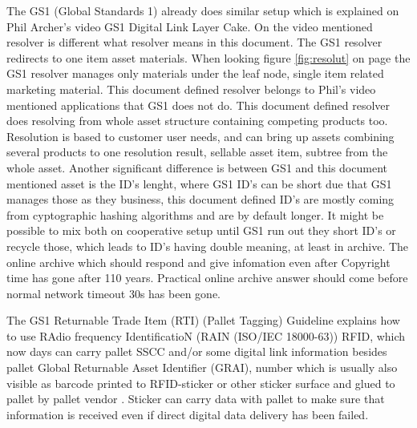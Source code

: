 The GS1 (Global Standards 1) already does similar setup which is explained on
Phil Archer's video GS1 Digital Link Layer Cake\cite{GS1DigitalLink}. On the
video mentioned resolver is different what resolver means in this document.
The GS1 resolver redirects to one item asset materials. When looking figure
\ref{fig:resolut} on page \pageref{fig:resolut} the GS1 resolver manages only
materials under the leaf node, single item related marketing material. This
document defined resolver belongs to Phil's video mentioned applications that
GS1 does not do. This document defined resolver does resolving from whole
asset structure containing competing products too. Resolution is based to
customer user needs, and  can bring up assets combining several products to one
resolution result, sellable asset item, subtree from the whole asset. Another
significant difference is between GS1 and this document mentioned asset is the
ID's lenght, where GS1 ID's can be short due that GS1 manages those as they
business, this document defined ID's are mostly coming from cyptographic
hashing algorithms\cite{CompHashFunc} and are by default longer.
It might be possible to mix both on cooperative setup until GS1 run out they
short ID's or recycle those, which leads to ID's having double meaning, at
least in archive. The online archive which should respond and give infomation
even after Copyright time \cite{CopyrightLengths} has gone after 110 years.
Practical online archive answer should come before normal network timeout 30s
has been gone. %

The GS1 Returnable Trade Item (RTI) (Pallet Tagging) Guideline\cite{RTIguideline}
explains how to use RAdio frequency IdentificatioN (RAIN (ISO/IEC 18000-63))
RFID\cite{UHFforRAIN}, which now days can carry pallet SSCC and/or some digital
link information besides pallet Global Returnable Asset Identifier (GRAI),
number which is usually also visible as barcode printed to RFID-sticker
or other sticker surface and glued to pallet by pallet vendor
\cite{EPalIPal}\cite{AllGreenPallets}\cite{iGpsRFID}\cite{SRSpallets}\cite{CramerRFIDoption}\cite{ChepIcoQube}.
Sticker can carry data with pallet to make sure that information
is received even if direct digital data delivery has been failed.


